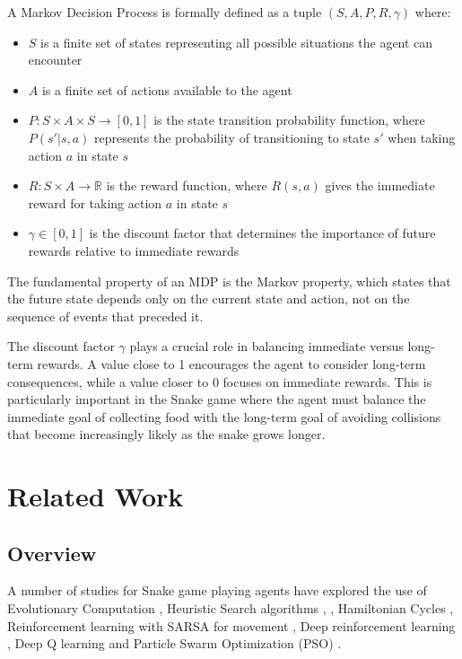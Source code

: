 \documentclass[a4paper,12pt]{article}
\begin{document}
A Markov Decision Process is formally defined as a tuple $(S, A, P, R, \gamma)$ where:
\begin{itemize}
\item $S$ is a finite set of states representing all possible situations the agent can encounter
\item $A$ is a finite set of actions available to the agent
\item $P: S \times A \times S \to [0,1]$ is the state transition probability function, where $P(s'|s,a)$ represents the probability of transitioning to state $s'$ when taking action $a$ in state $s$
\item $R: S \times A \to \mathbb{R}$ is the reward function, where $R(s,a)$ gives the immediate reward for taking action $a$ in state $s$
\item $\gamma \in [0,1]$ is the discount factor that determines the importance of future rewards relative to immediate rewards
\end{itemize}

The fundamental property of an MDP is the Markov property, which states that the future state depends only on the current state and action, not on the sequence of events that preceded it.

The discount factor $\gamma$ plays a crucial role in balancing immediate versus long-term rewards. A value close to 1 encourages the agent to consider long-term consequences, while a value closer to 0 focuses on immediate rewards. This is particularly important in the Snake game where the agent must balance the immediate goal of collecting food with the long-term goal of avoiding collisions that become increasingly likely as the snake grows longer.

\section{Related Work}
\subsection{Overview}
A number of studies for Snake game playing agents have explored the use of Evolutionary Computation \cite{EA2}, 
Heuristic Search algorithms \cite{Heuristic1}, \cite{Heuristic2}, 
Hamiltonian Cycles \cite{Heuristic3}, Reinforcement learning with SARSA for movement \cite{Reinforcement1}, 
Deep reinforcement learning \cite{Reinforcement2}, Deep Q learning \cite{Reinforcement4} \cite{Reinforcement6} and Particle Swarm Optimization (PSO) \cite{Unsupervised1}.
\end{document}
